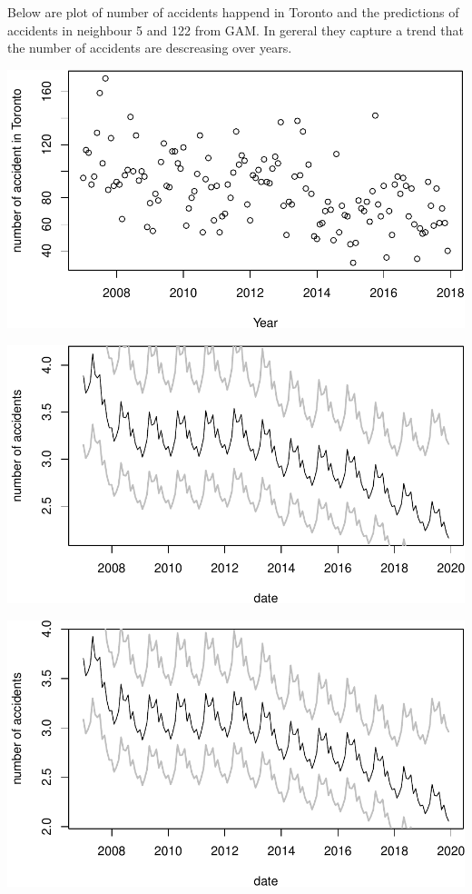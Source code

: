 \documentclass[]{article}
\begin{document}
Below are plot of number of accidents happend in Toronto and the
predictions of accidents in neighbour 5 and 122 from GAM. In gereral
they capture a trend that the number of accidents are descreasing over
years.

\includegraphics{Project_II-Final-20190404_files/figure-latex/unnamed-chunk-18-1.pdf}

\includegraphics{Project_II-Final-20190404_files/figure-latex/unnamed-chunk-19-1.pdf}

\includegraphics{Project_II-Final-20190404_files/figure-latex/unnamed-chunk-20-1.pdf}
\end{document}
